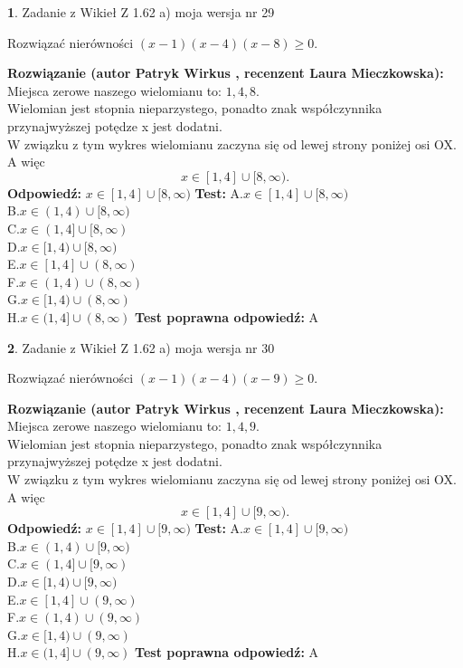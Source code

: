 \documentclass[12pt, a4paper]{article}
\theoremstyle{definition} %
\newtheorem{zad}{}
\newcommand{\zadStart}[1]{\begin{zad}#1\newline}
\newcommand{\zadStop}{\end{zad}}
\newcommand{\rozwStart}[2]{\noindent \textbf{Rozwiązanie (autor #1 , recenzent #2): }\newline}
\newcommand{\rozwStop}{\newline}
\newcommand{\odpStart}{\noindent \textbf{Odpowiedź:}\newline}
\newcommand{\odpStop}{\newline}
\newcommand{\testStart}{\noindent \textbf{Test:}\newline}
\newcommand{\testStop}{\newline}
\newcommand{\kluczStart}{\noindent \textbf{Test poprawna odpowiedź:}\newline}
\newcommand{\kluczStop}{\newline}
\begin{document}
\zadStart{Zadanie z Wikieł Z 1.62 a) moja wersja nr 29}

Rozwiązać nierówności $(x-1)(x-4)(x-8)\ge0$.
\zadStop
\rozwStart{Patryk Wirkus}{Laura Mieczkowska}
Miejsca zerowe naszego wielomianu to: $1, 4, 8$.\\
Wielomian jest stopnia nieparzystego, ponadto znak współczynnika przy\linebreak najwyższej potędze x jest dodatni.\\ W związku z tym wykres wielomianu zaczyna się od lewej strony poniżej osi OX. A więc $$x \in [1,4] \cup [8,\infty).$$
\rozwStop
\odpStart
$x \in [1,4] \cup [8,\infty)$
\odpStop
\testStart
A.$x \in [1,4] \cup [8,\infty)$\\
B.$x \in (1,4) \cup [8,\infty)$\\
C.$x \in (1,4] \cup [8,\infty)$\\
D.$x \in [1,4) \cup [8,\infty)$\\
E.$x \in [1,4] \cup (8,\infty)$\\
F.$x \in (1,4) \cup (8,\infty)$\\
G.$x \in [1,4) \cup (8,\infty)$\\
H.$x \in (1,4] \cup (8,\infty)$
\testStop
\kluczStart
A
\kluczStop



\zadStart{Zadanie z Wikieł Z 1.62 a) moja wersja nr 30}

Rozwiązać nierówności $(x-1)(x-4)(x-9)\ge0$.
\zadStop
\rozwStart{Patryk Wirkus}{Laura Mieczkowska}
Miejsca zerowe naszego wielomianu to: $1, 4, 9$.\\
Wielomian jest stopnia nieparzystego, ponadto znak współczynnika przy\linebreak najwyższej potędze x jest dodatni.\\ W związku z tym wykres wielomianu zaczyna się od lewej strony poniżej osi OX. A więc $$x \in [1,4] \cup [9,\infty).$$
\rozwStop
\odpStart
$x \in [1,4] \cup [9,\infty)$
\odpStop
\testStart
A.$x \in [1,4] \cup [9,\infty)$\\
B.$x \in (1,4) \cup [9,\infty)$\\
C.$x \in (1,4] \cup [9,\infty)$\\
D.$x \in [1,4) \cup [9,\infty)$\\
E.$x \in [1,4] \cup (9,\infty)$\\
F.$x \in (1,4) \cup (9,\infty)$\\
G.$x \in [1,4) \cup (9,\infty)$\\
H.$x \in (1,4] \cup (9,\infty)$
\testStop
\kluczStart
A
\kluczStop
\end{document}
